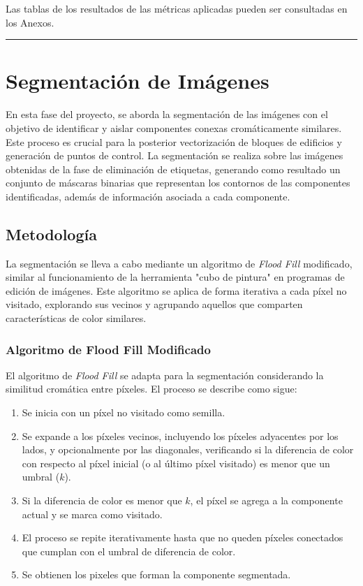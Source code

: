 \documentclass[twocolumn, fontsize=10pt]{article}
\begin{document}
Las tablas de los resultados de las métricas aplicadas pueden ser consultadas en los Anexos.


\rule{\linewidth}{0.5pt}
\section{Segmentación de Imágenes}

En esta fase del proyecto, se aborda la segmentación de las imágenes con el objetivo de identificar y aislar componentes conexas cromáticamente similares. Este proceso es crucial para la posterior vectorización de bloques de edificios y generación de puntos de control. La segmentación se realiza sobre las imágenes obtenidas de la fase de eliminación de etiquetas, generando como resultado un conjunto de máscaras binarias que representan los contornos de las componentes identificadas, además de información asociada a cada componente.

\subsection{Metodología}
La segmentación se lleva a cabo mediante un algoritmo de \textit{Flood Fill}  \cite{floodfill} modificado, similar al funcionamiento de la herramienta "cubo de pintura" en programas de edición de imágenes. Este algoritmo se aplica de forma iterativa a cada píxel no visitado, explorando sus vecinos y agrupando aquellos que comparten características de color similares.

\subsubsection{Algoritmo de Flood Fill Modificado}
El algoritmo de \textit{Flood Fill} se adapta para la segmentación considerando la similitud cromática entre píxeles. El proceso se describe como sigue:

\begin{enumerate}
    \item Se inicia con un píxel no visitado como semilla.
    \item Se expande a los píxeles vecinos, incluyendo los píxeles adyacentes por los lados, y opcionalmente por las diagonales, verificando si la diferencia de color con respecto al píxel inicial (o al último píxel visitado) es menor que un umbral ($\textit{k}$).
    \item Si la diferencia de color es menor que $\textit{k}$, el píxel se agrega a la componente actual y se marca como visitado.
    \item El proceso se repite iterativamente hasta que no queden píxeles conectados que cumplan con el umbral de diferencia de color.
    \item Se obtienen los pixeles que forman la componente segmentada.
\end{enumerate}
\end{document}
